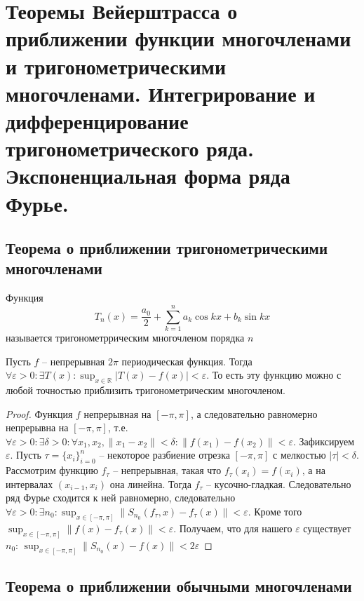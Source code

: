 \documentclass[document.tex]{subfiles}
\begin{document}
\section{Теоремы Вейерштрасса о приближении функции многочленами и тригонометрическими многочленами. Интегрирование и
дифференцирование тригонометрического ряда. Экспоненциальная форма ряда Фурье.}
\subsection{Теорема о приближении тригонометрическими многочленами}
\begin{definition}
	Функция
	$$T_n(x) = \frac{a_0}{2} + \sum_{k = 1}^n a_k \cos kx + b_k \sin kx$$
	называется тригонометррическим многочленом порядка $n$
\end{definition}

\begin{theorem}
	Пусть $f$ -- непрерывная $2 \pi$ периодическая функция. Тогда $\forall \varepsilon > 0 : \exists T(x) : \sup_{x \in
        \mathbb{R}} |T(x) - f(x)| < \varepsilon$. То есть эту функцию можно с любой точностью приблизить
        тригонометрическим многочленом.
\end{theorem}

\begin{proof}
    Функция $f$ непрерывная на $[-\pi, \pi]$, а следовательно равномерно непрерывна на $[-\pi, \pi]$, т.е. $\forall
    \varepsilon > 0: \exists \delta > 0: \forall x_1, x_2, \|x_1 - x_2\| < \delta: \|f(x_1) - f(x_2)\| < \varepsilon$.
    Зафиксируем $\varepsilon$. Пусть
    $\tau = \{x_i\}_{i = 0}^n$ -- некоторое разбиение отрезка $[-\pi, \pi]$ с мелкостью $|\tau| < \delta$.
    Рассмотрим функцию $f_{\tau}$ -- непрерывная,
    такая что $f_{\tau}(x_i) = f(x_i)$, а на интервалах $(x_{i -1 }, x_i)$ она линейна. Тогда $f_{\tau}$ -- кусочно-гладкая.
    Следовательно ряд Фурье сходится к ней равномерно, следовательно $\forall \varepsilon > 0 : \exists n_0 :
    \sup_{x \in [-\pi, \pi]}\|S_{n_0}(f_{\tau}, x) - f_{\tau}(x)\| < \varepsilon$. Кроме того $\sup_{x \in [-\pi, \pi]}
    \|f(x) - f_{\tau}(x)\| < \varepsilon$. Получаем, что для нашего $\varepsilon$ существует $n_0$: $\sup_{x \in [-\pi,
    \pi]} \|S_{n_0}(x) - f(x)\| < 2\varepsilon$

\end{proof}

\subsection{Теорема о приближении обычными многочленами}
\end{document}
